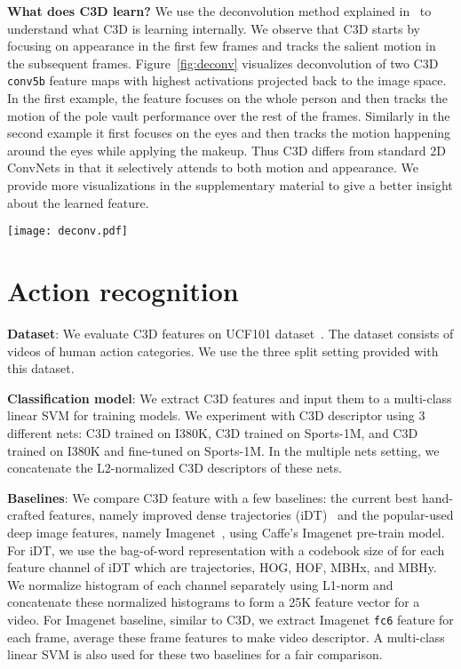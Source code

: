 \documentclass[10pt,twocolumn,letterpaper]{article}
\begin{document}
{\bf What does C3D learn?} We use the deconvolution method explained in~\cite{ZeilerF14} to understand what C3D is learning internally. We observe that C3D starts by focusing on appearance in the first few frames and tracks the salient motion in the subsequent frames. Figure~\ref{fig:deconv} visualizes deconvolution of two C3D \texttt{conv5b} feature maps with highest activations projected back to the image space. In the first example, the feature focuses on the whole person and then tracks the motion of the pole vault performance over the rest of the frames. Similarly in the second example it first focuses on the eyes and then tracks the motion happening around the eyes while applying the makeup. Thus C3D differs from standard 2D ConvNets in that it selectively attends to both motion and appearance. We provide more visualizations in the supplementary material to give a better insight about the learned feature. 

\begin{figure*}
\begin{center}
   \texttt{[image: deconv.pdf]}
\end{center}
\vspace{-12pt}
   \caption{{\bf Visualization of C3D model, using the method from~\cite{ZeilerF14}}. Interestingly, C3D captures appearance for the first few frames but thereafter only attends to salient motion. Best viewed on a color screen.}
\label{fig:deconv}
\end{figure*}
%
 
\section{Action recognition}
\label{sec:action_recognition}
{\bf Dataset}: We evaluate C3D features on UCF101 dataset~\cite{UCF101}. The dataset consists of  videos of  human action categories. We use the three split setting provided with this dataset.

{\bf Classification model}: We extract C3D features and input them to a multi-class linear SVM for training models. We experiment with C3D descriptor using 3 different nets: C3D trained on I380K, C3D trained on Sports-1M, and C3D trained on I380K and fine-tuned on Sports-1M. In the multiple nets setting, we concatenate the L2-normalized C3D descriptors of these nets.

{\bf Baselines}: We compare C3D feature with a few baselines: the current best hand-crafted features, namely improved dense trajectories (iDT)~\cite{Wang2013} and the popular-used deep image features, namely Imagenet~\cite{jia2014caffe}, using Caffe's Imagenet pre-train model. For iDT, we use the bag-of-word representation with a codebook size of  for each feature channel of iDT which are trajectories, HOG, HOF, MBHx, and MBHy. We normalize histogram of each channel separately using L1-norm and concatenate these normalized histograms to form a 25K feature vector for a video. For Imagenet baseline, similar to C3D, we extract Imagenet \texttt{fc6} feature for each frame, average these frame features to make video descriptor. A multi-class linear SVM is also used for these two baselines for a fair comparison.
\end{document}
